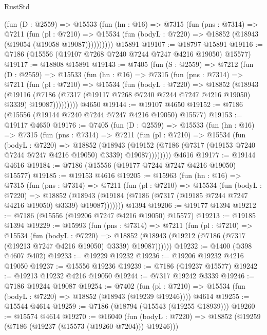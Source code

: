 \begin{lexlean}{RustStd}
\begin{coremodule}
{\begin{coremodule}
{{{{{{{{{{{{{{{{{{{{{{{{{{{{{{{{        (fun (D : @2559) =>
        @15533
          (fun (hn : @16) =>
          @7315
            (fun (pns : @7314) =>
            @7211
              (fun (pl : @7210) =>
              @15534 (fun (bodyL : @7220) => @18852 (@18943 (@19054 (@19058 @19087))))))))))
    @15891
@19107 := @18797 @15891
@19116 := @7186 (@15556 (@19107 @7268 @7240 @7244 @7247 @4216 @19050) @15577)
@19117 := @18808 @15891
@19143 := @7405
    (fun (S : @2559) =>
    @7212
      (fun (D : @2559) =>
      @15533
        (fun (hn : @16) =>
        @7315
          (fun (pns : @7314) =>
          @7211
            (fun (pl : @7210) =>
            @15534
              (fun (bodyL : @7220) =>
              @18852
                (@18943
                  (@19116
                    (@7186
                      (@7317 (@19117 @7268 @7240 @7244 @7247 @4216 @19050) @3339)
                      @19087)))))))))
    @4650
@19144 := @19107 @4650
@19152 := @7186 (@15556 (@19144 @7240 @7244 @7247 @4216 @19050) @15577)
@19153 := @19117 @4650
@19176 := @7405
    (fun (D : @2559) =>
    @15533
      (fun (hn : @16) =>
      @7315
        (fun (pns : @7314) =>
        @7211
          (fun (pl : @7210) =>
          @15534
            (fun (bodyL : @7220) =>
            @18852
              (@18943
                (@19152 (@7186 (@7317 (@19153 @7240 @7244 @7247 @4216 @19050) @3339) @19087))))))))
    @4616
@19177 := @19144 @4616
@19184 := @7186 (@15556 (@19177 @7244 @7247 @4216 @19050) @15577)
@19185 := @19153 @4616
@19205 := @15963
    (fun (hn : @16) =>
    @7315
      (fun (pns : @7314) =>
      @7211
        (fun (pl : @7210) =>
        @15534
          (fun (bodyL : @7220) =>
          @18852
            (@18943 (@19184 (@7186 (@7317 (@19185 @7244 @7247 @4216 @19050) @3339) @19087)))))))
    @1394
@19206 := @19177 @1394
@19212 := @7186 (@15556 (@19206 @7247 @4216 @19050) @15577)
@19213 := @19185 @1394
@19229 := @15993
    (fun (pns : @7314) =>
    @7211
      (fun (pl : @7210) =>
      @15534
        (fun (bodyL : @7220) =>
        @18852 (@18943 (@19212 (@7186 (@7317 (@19213 @7247 @4216 @19050) @3339) @19087))))))
@19232 := @1400 (@398 @4607 @402)
@19233 := @19229 @19232
@19236 := @19206 @19232 @4216 @19050
@19237 := @15556 @19236
@19239 := @7186 (@19237 @15577)
@19242 := @19213 @19232 @4216 @19050
@19244 := @7317 @19242 @3339
@19246 := @7186 @19244 @19087
@19254 := @7402
    (fun (pl : @7210) => @15534 (fun (bodyL : @7220) => @18852 (@18943 (@19239 @19246))))
    @4614
@19255 := @15544 @4614
@19259 := @7186 (@18794 (@15543 (@19255 @18939)))
@19260 := @15574 @4614
@19270 := @16040
    (fun (bodyL : @7220) => @18852 (@19259 (@7186 (@19237 (@15573 (@19260 @7204))) @19246)))
}}}}}}}}}}}}}}}}}}}}}}}}}}}}}}}}
\end{coremodule}}
\end{coremodule}
\end{lexlean}
